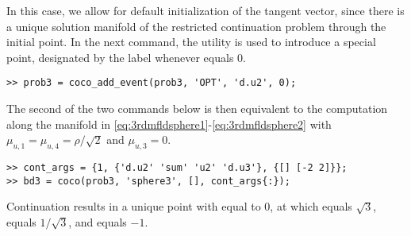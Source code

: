 In this case, we allow for default initialization of the tangent vector, since there is a unique solution manifold of the restricted continuation problem through the initial point. In the next command, the  utility is used to introduce a special point, designated by the label  whenever  equals $0$. 
\begin{lstlisting}[language=coco-highlight]
>> prob3 = coco_add_event(prob3, 'OPT', 'd.u2', 0);
\end{lstlisting}
The second of the two commands below is then equivalent to the computation along the manifold in \eqref{eq:3rdmfldsphere1}-\eqref{eq:3rdmfldsphere2} with $\mu_{u,1}=\mu_{u,4}=\rho/\sqrt{2}$ and $\mu_{u,3}=0$.
\begin{lstlisting}[language=coco-highlight]
>> cont_args = {1, {'d.u2' 'sum' 'u2' 'd.u3'}, {[] [-2 2]}};
>> bd3 = coco(prob3, 'sphere3', [], cont_args{:});
\end{lstlisting}
Continuation results in a unique point with  equal to $0$, at which  equals $\sqrt{3}$,  equals $1/\sqrt{3}$, and  equals $-1$.

